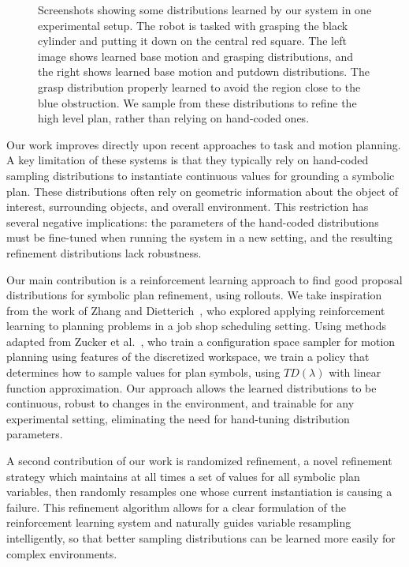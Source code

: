 \begin{figure}[h]
  \caption{Screenshots showing some distributions learned by our system in one experimental
    setup. The robot is tasked with grasping the black cylinder and putting it down on the
    central red square. The left image shows learned base motion and grasping distributions,
    and the right shows learned base motion and putdown distributions. The grasp distribution
    properly learned to avoid the region close to the blue obstruction. We sample from these distributions
    to refine the high level plan, rather than relying on hand-coded ones.}
  \label{fig:cover}
\end{figure}

Our work improves directly upon recent approaches to task and motion planning.
A key limitation of these systems is that they typically rely on hand-coded
sampling distributions to instantiate continuous values for grounding a symbolic plan.
These distributions often rely on
geometric information about the object of interest, surrounding objects, and overall
environment. This restriction has several negative implications: the parameters of the
hand-coded distributions must be fine-tuned when running the system in a new setting, and the
resulting refinement distributions lack robustness.

Our main contribution is a reinforcement learning approach to find good proposal
distributions for symbolic plan refinement, using rollouts. We take inspiration
from the work of Zhang and Dietterich~\cite{JobShopSched}, who explored applying reinforcement learning
to planning problems in a job shop scheduling setting. Using methods adapted from
Zucker et al.~\cite{workspacebias}, who train a configuration space sampler for motion planning
using features of the discretized workspace, we train a policy that
determines how to sample values for plan symbols, using $TD(\lambda)$ with linear function
approximation. Our approach allows
the learned distributions to be continuous, robust to changes in the environment, and
trainable for any experimental setting, eliminating the need for hand-tuning distribution parameters.

A second contribution of our work is randomized refinement, a novel refinement strategy
which maintains at all times a set of values for all symbolic plan variables, then randomly
resamples one whose current instantiation is causing a failure.
This refinement algorithm allows for a clear formulation of the reinforcement
learning system and naturally guides variable resampling intelligently, so that better
sampling distributions can be learned more easily for complex environments.

